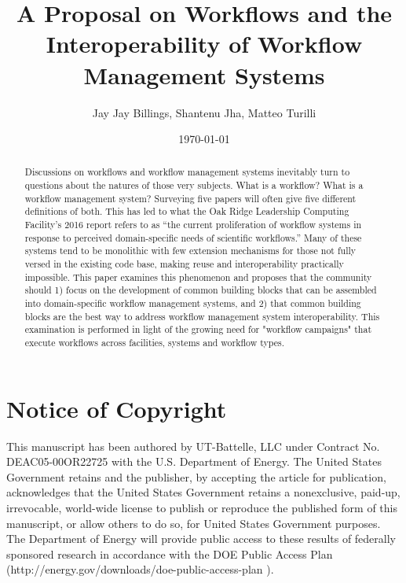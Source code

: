 \documentclass[conference]{IEEEtran}
\title{\todo{Need new title!}A Proposal on Workflows and the Interoperability of Workflow Management Systems}
\author{Jay Jay Billings, Shantenu Jha, Matteo Turilli}
\date{\today}
\begin{document}
\maketitle

\begin{abstract}

Discussions on workflows and workflow management systems inevitably turn to questions about the natures of those very subjects. What is a workflow? What is a workflow management system? Surveying five papers will often give five different definitions of both. This has led to what the Oak Ridge Leadership Computing Facility’s 2016 report refers to as “the current proliferation of workflow systems in response to perceived domain-specific needs of scientific workflows.” Many of these systems tend to be monolithic with few extension mechanisms for those not fully versed in the existing code base, making reuse and interoperability practically impossible. This paper examines this phenomenon and proposes that the community should 1) focus on the development of common building blocks that can be assembled into domain-specific workflow management systems, and 2) that common building blocks are the best way to address workflow management system interoperability. This examination is performed in light of the growing need for "workflow campaigns" that execute workflows across facilities, systems and workflow types.

\end{abstract}

\section{Notice of Copyright}\label{notice-of-copyright}

This manuscript has been authored by UT-Battelle, LLC under Contract No.
DEAC05-00OR22725 with the U.S. Department of Energy. The United States
Government retains and the publisher, by accepting the article for
publication, acknowledges that the United States Government retains a
nonexclusive, paid-up, irrevocable, world-wide license to publish or
reproduce the published form of this manuscript, or allow others to do
so, for United States Government purposes. The Department of Energy will
provide public access to these results of federally sponsored research
in accordance with the DOE Public Access Plan
(http://energy.gov/downloads/doe-public-access-plan ).













\end{document}
